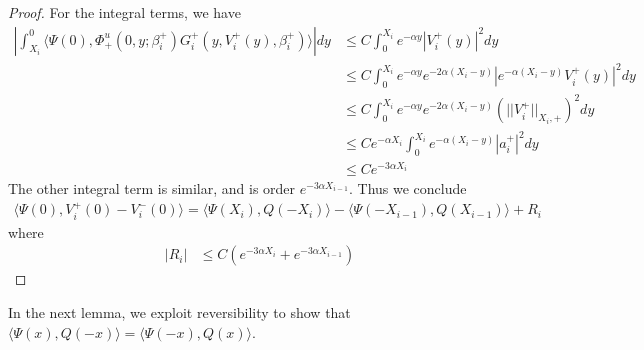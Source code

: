 \documentclass[thesis.tex]{subfiles}
\begin{document}
\begin{lemma}
\begin{proof}
For the integral terms, we have
\begin{align*}
\left| \int_{X_i}^0 \langle \Psi(0), \Phi_+^u(0, y; \beta_i^+) G_i^+(y, V_i^+(y),\beta_i^+) \rangle \right| dy &\leq C \int_0^{X_i} e^{-\alpha y} |V_i^+(y)|^2 dy \\
&\leq C \int_0^{X_i} e^{-\alpha y} e^{-2 \alpha(X_i - y)}|e^{-\alpha (X_i - y)} V_i^+(y)|^2 dy \\
&\leq C \int_0^{X_i} e^{-\alpha y} e^{-2 \alpha(X_i - y)}(||V_i^+||_{X_i, +})^2 dy \\
&\leq C e^{-\alpha X_i} \int_0^{X_i} e^{-\alpha (X_i - y)} |a_i^+|^2 dy \\
&\leq C e^{-3 \alpha X_i}
\end{align*}
The other integral term is similar, and is order $e^{-3 \alpha X_{i-1}}$. Thus we conclude
\begin{align*}
\langle \Psi(0), V_i^+(0) - V_i^-(0) \rangle = 
\langle \Psi(X_i), Q(-X_i) \rangle - \langle \Psi(-X_{i-1}), Q(X_{i-1}) \rangle + R_i
\end{align*}
where 
\begin{align*}
|R_i| &\leq C( e^{-3 \alpha X_i} +  e^{-3 \alpha X_{i-1}})
\end{align*}
\end{proof}
\end{lemma}

In the next lemma, we exploit reversibility to show that $\langle \Psi(x), Q(-x) \rangle = \langle \Psi(-x), Q(x) \rangle$.
\end{document}
